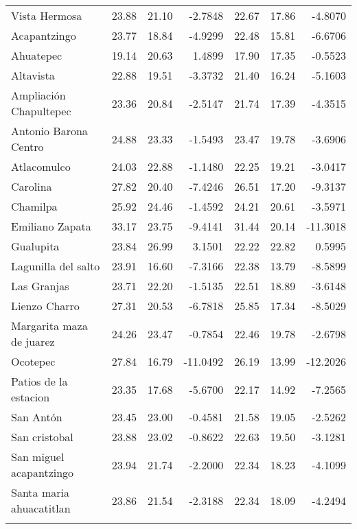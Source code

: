 \documentclass[]{article}
\begin{document}
\begin{longtable}[c]{@{}lrrrrrr@{}}
\\\addlinespace
Vista Hermosa & 23.88 & 21.10 & -2.7848 & 22.67 & 17.86 & -4.8070
\\\addlinespace
Acapantzingo & 23.77 & 18.84 & -4.9299 & 22.48 & 15.81 & -6.6706
\\\addlinespace
Ahuatepec & 19.14 & 20.63 & 1.4899 & 17.90 & 17.35 & -0.5523
\\\addlinespace
Altavista & 22.88 & 19.51 & -3.3732 & 21.40 & 16.24 & -5.1603
\\\addlinespace
Ampliación Chapultepec & 23.36 & 20.84 & -2.5147 & 21.74 & 17.39 &
-4.3515
\\\addlinespace
Antonio Barona Centro & 24.88 & 23.33 & -1.5493 & 23.47 & 19.78 &
-3.6906
\\\addlinespace
Atlacomulco & 24.03 & 22.88 & -1.1480 & 22.25 & 19.21 & -3.0417
\\\addlinespace
Carolina & 27.82 & 20.40 & -7.4246 & 26.51 & 17.20 & -9.3137
\\\addlinespace
Chamilpa & 25.92 & 24.46 & -1.4592 & 24.21 & 20.61 & -3.5971
\\\addlinespace
Emiliano Zapata & 33.17 & 23.75 & -9.4141 & 31.44 & 20.14 & -11.3018
\\\addlinespace
Gualupita & 23.84 & 26.99 & 3.1501 & 22.22 & 22.82 & 0.5995
\\\addlinespace
Lagunilla del salto & 23.91 & 16.60 & -7.3166 & 22.38 & 13.79 & -8.5899
\\\addlinespace
Las Granjas & 23.71 & 22.20 & -1.5135 & 22.51 & 18.89 & -3.6148
\\\addlinespace
Lienzo Charro & 27.31 & 20.53 & -6.7818 & 25.85 & 17.34 & -8.5029
\\\addlinespace
Margarita maza de juarez & 24.26 & 23.47 & -0.7854 & 22.46 & 19.78 &
-2.6798
\\\addlinespace
Ocotepec & 27.84 & 16.79 & -11.0492 & 26.19 & 13.99 & -12.2026
\\\addlinespace
Patios de la estacion & 23.35 & 17.68 & -5.6700 & 22.17 & 14.92 &
-7.2565
\\\addlinespace
San Antón & 23.45 & 23.00 & -0.4581 & 21.58 & 19.05 & -2.5262
\\\addlinespace
San cristobal & 23.88 & 23.02 & -0.8622 & 22.63 & 19.50 & -3.1281
\\\addlinespace
San miguel acapantzingo & 23.94 & 21.74 & -2.2000 & 22.34 & 18.23 &
-4.1099
\\\addlinespace
Santa maria ahuacatitlan & 23.86 & 21.54 & -2.3188 & 22.34 & 18.09 &
-4.2494
\\\addlinespace

\end{longtable}
\end{document}
